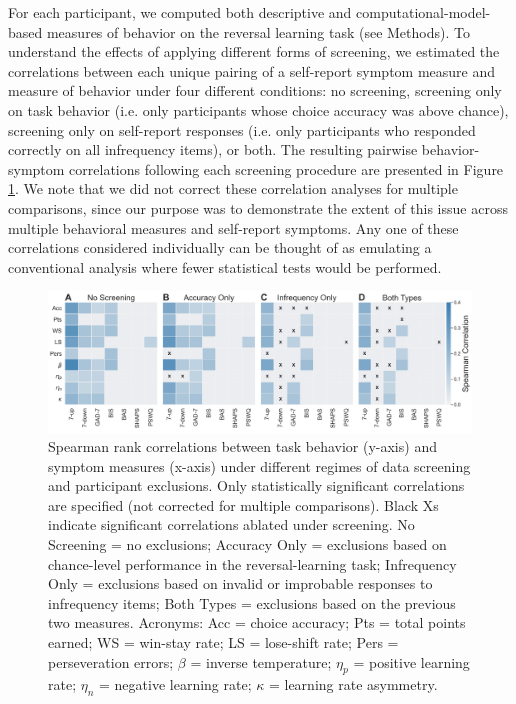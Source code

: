 \documentclass[a4paper,notitlepage,12pt]{article}
\begin{document}
For each participant, we computed both descriptive and computational-model-based measures of behavior on the reversal learning task (see Methods). To understand the effects of applying different forms of screening, we estimated the correlations between each unique pairing of a self-report symptom measure and measure of behavior under four different conditions: no screening, screening only on task behavior (i.e. only participants whose choice accuracy was above chance), screening only on self-report responses (i.e. only participants who responded correctly on all infrequency items), or both. The resulting pairwise behavior-symptom correlations following each screening procedure are presented in Figure \ref{fig:correlations}. We note that we did not correct these correlation analyses for multiple comparisons, since our purpose was to demonstrate the extent of this issue across multiple behavioral measures and self-report symptoms. Any one of these correlations considered individually can be thought of as emulating a conventional analysis where fewer statistical tests would be performed.

\begin{figure}[!t]
\includegraphics[width=17cm]{../figures/main_03a.png}
\centering
\captionsetup{width=0.88\textwidth}
\caption{Spearman rank correlations between task behavior (y-axis) and symptom measures (x-axis) under different regimes of data screening and participant exclusions. Only statistically significant correlations are specified (not corrected for multiple comparisons). Black Xs indicate significant correlations ablated under screening. No Screening = no exclusions; Accuracy Only = exclusions based on chance-level performance in the reversal-learning task; Infrequency Only = exclusions based on invalid or improbable responses to infrequency items; Both Types = exclusions based on the previous two measures. Acronyms: Acc = choice accuracy; Pts = total points earned; WS = win-stay rate; LS = lose-shift rate; Pers = perseveration errors; $\beta$ = inverse temperature; $\eta_p$ = positive learning rate; $\eta_n$ = negative learning rate; $\kappa$ = learning rate asymmetry.}
\label{fig:correlations}
\end{figure}
\end{document}

